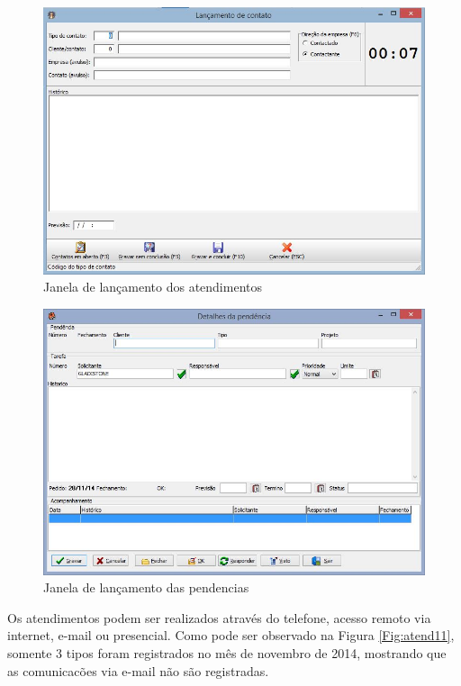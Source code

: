 \begin{figure}[!h]
\centering
\includegraphics[scale=0.6]{figuras/jan_contatos_lancamento.jpg}
\caption{Janela de lançamento dos atendimentos}
\label{Fig:jan:contatos:lanca}
\end{figure}

\begin{figure}[!h]
\centering
\includegraphics[scale=0.6]{figuras/jan_pendencias_lancamento.jpg}
\caption{Janela de lançamento das pendencias}
\label{Fig:jan:pendencias:lanca}
\end{figure}

Os atendimentos podem ser realizados através do telefone, acesso remoto via internet, e-mail ou presencial. Como pode ser observado na Figura \ref{Fig:atend11}, somente 3 tipos foram registrados no mês de novembro de 2014, mostrando que as comunicacões via e-mail não são registradas.

